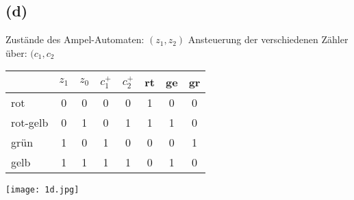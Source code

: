 \documentclass[11pt,a4paper]{article}
\begin{document}
\subsection*{(d)}

Zustände des Ampel-Automaten: $(z_1, z_2)$
Ansteuerung der verschiedenen Zähler über: $(c_1, c_2$

\begin{center}
\begin{tabular}{l c c | c c | c c c}
 & $z_1$ & $z_0$ & $c_1^+$ & $c_2^+$ & rt & ge & gr\\
 \hline
rot      & 0 & 0 & 0 & 0 & 1 & 0 & 0\\
rot-gelb & 0 & 1 & 0 & 1 & 1 & 1 & 0\\
grün     & 1 & 0 & 1 & 0 & 0 & 0 & 1\\
gelb     & 1 & 1 & 1 & 1 & 0 & 1 & 0
\end{tabular}
\end{center}

\texttt{[image: 1d.jpg]}
\end{document}
